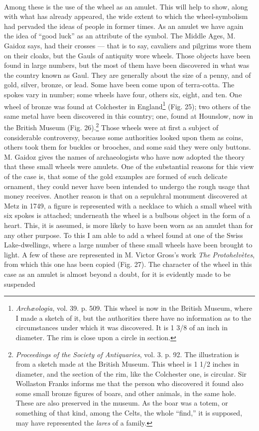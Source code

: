 \documentclass[a4paper, 11pt, oneside, polutonikogreek, english]{article}
\begin{document}
\paragraph{}
Among these is the use of the wheel as an amulet. This will help to show, along with what has already appeared, the wide extent to which the wheel-symbolism had pervaded the ideas of people in former times. As an amulet we have again the idea of ``good luck'' as an attribute of the symbol. The Middle Ages, M. Gaidoz says, had their crosses --- that is to say, cavaliers and pilgrims wore them on their cloaks, but the Gauls of antiquity wore wheels. Those objects have been found in large numbers, but the most of them have been discovered in what was the country known as Gaul. They are generally about the size of a penny, and of gold, silver, bronze, or lead. Some have been come upon of terra-cotta. The spokes vary in number; some wheels have four, others six, eight, and ten. One wheel of bronze was found at Colchester in England\footnote{\emph{Archæologia}, vol. 39. p. 509. This wheel is now in the British Museum, where I made a sketch of it, but the authorities there have no information as to the circumstances under which it was discovered. It is 1 3/8 of an inch in diameter. The rim is close upon a circle in section.} (Fig. 25); two others of the same metal have been discovered in this country; one, found at Hounslow, now in the British Museum (Fig. 26).\footnote{\emph{Proceedings of the Society of Antiquaries}, vol. 3. p. 92. The illustration is from a sketch made at the British Museum. This wheel is 1 1/2 inches in diameter, and the section of the rim, like the Colchester one, is circular. Sir Wollaston Franks informs me that the person who discovered it found also some small bronze figures of boars, and other animals, in the same hole. These are also preserved in the museum. As the boar was a totem, or something of that kind, among the Celts, the whole ``find,'' it is supposed, may have represented the \emph{lares} of a family.} Those wheels were at first a subject of considerable controversy, because some authorities looked upon them as coins, others took them for buckles or brooches, and some said they were only buttons. M. Gaidoz gives the names of archaeologists who have now adopted the theory that these small wheels were amulets. One of the substantial reasons for this view of the case is, that some of the gold examples are formed of such delicate ornament, they could never have been intended to undergo the rough usage that money receives. Another reason is that on a sepulchral monument discovered at Metz in 1749, a figure is represented with a necklace to which a small wheel with six spokes is attached; underneath the wheel is a bulbous object in the form of a heart. This, it is assumed, is more likely to have been worn as an amulet than for any other purpose. To this I am able to add a wheel found at one of the Swiss Lake-dwellings, where a large number of these small wheels have been brought to light. A few of these are represented in M. Victor Gross's work \emph{The Protohelvètes}, from which this one has been copied (Fig. 27). The character of the wheel in this case as an amulet is almost beyond a doubt, for it is evidently made to be suspended 
\end{document}
